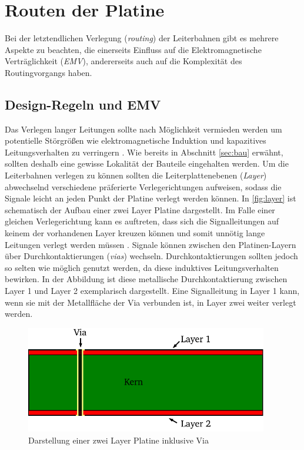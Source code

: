 \section{Routen der Platine}
Bei der letztendlichen Verlegung (\textit{routing}) der Leiterbahnen gibt es mehrere Aspekte zu beachten, die einerseits Einfluss auf die Elektromagnetische Verträglichkeit (\textit{EMV}), andererseits auch auf die Komplexität des Routingvorgangs haben.
\subsection{Design-Regeln und EMV}\label{sec:design}
Das Verlegen langer Leitungen sollte nach Möglichkeit vermieden werden um potentielle Störgrößen wie elektromagnetische Induktion und kapazitives Leitungsverhalten zu verringern \cite{haendschke}. Wie bereits in Abschnitt \autoref{sec:bau} erwähnt, sollten deshalb eine gewisse Lokalität der Bauteile eingehalten werden. Um die Leiterbahnen verlegen zu können sollten die Leiterplattenebenen (\textit{Layer}) abwechselnd verschiedene präferierte Verlegerichtungen aufweisen, sodass die Signale leicht an jeden Punkt der Platine verlegt werden können. In \autoref{fig:layer} ist schematisch der Aufbau einer zwei Layer Platine dargestellt. Im Falle einer gleichen Verlegerichtung kann es auftreten, dass sich die Signalleitungen auf keinem der vorhandenen Layer kreuzen können und somit unnötig lange Leitungen verlegt werden müssen \cite{haendschke}. Signale können zwischen den Platinen-Layern über Durchkontaktierungen (\textit{vias}) wechseln. Durchkontaktierungen sollten jedoch so selten wie möglich genutzt werden, da diese induktives Leitungsverhalten bewirken. In der Abbildung ist diese metallische Durchkontaktierung zwischen Layer 1 und Layer 2 exemplarisch dargestellt. Eine Signalleitung in Layer 1 kann, wenn sie mit der Metallfläche der Via verbunden ist, in Layer zwei weiter verlegt werden.
\begin{figure}[H]%
\centering
\includegraphics[width=300pt]{./Bilder/layer}%
\caption{Darstellung einer zwei Layer Platine inklusive Via}%
\label{fig:layer}%
\end{figure}
